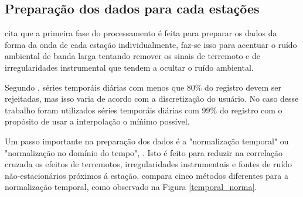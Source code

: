 \subsection{Preparação dos dados para cada estações}

\cite{bensen_processing_2007} cita que a primeira fase do processamento  é feita para preparar os dados da forma da onda de cada estação individualmente, faz-se isso para acentuar o ruído ambiental de banda larga tentando remover os sinais de terremoto e de irregularidades instrumental que tendem a ocultar o ruído ambiental.

Segundo \cite{bensen_processing_2007}, séries temporáis diárias com menos que 80\% do registro devem ser rejeitadas, mas isso varia de acordo com a discretização do usuário. No caso desse trabalho foram utilizados séries  temporáis diárias com 99\% do registro com o propósito de usar a interpolação o míńimo possível.

Um passo importante na preparação dos dados é a "normalização temporal" ou "normalização no domínio do tempo", \cite{bensen_processing_2007}. Isto é feito para reduzir na correlação cruzada os efeitos de terremotos, irregularidades instrumentais e fontes de ruído não-estacionários próximos á estação. \cite{bensen_processing_2007} compara cinco métodos diferentes para a normalização temporal, como observado na Figura \ref{temporal_norma}.


